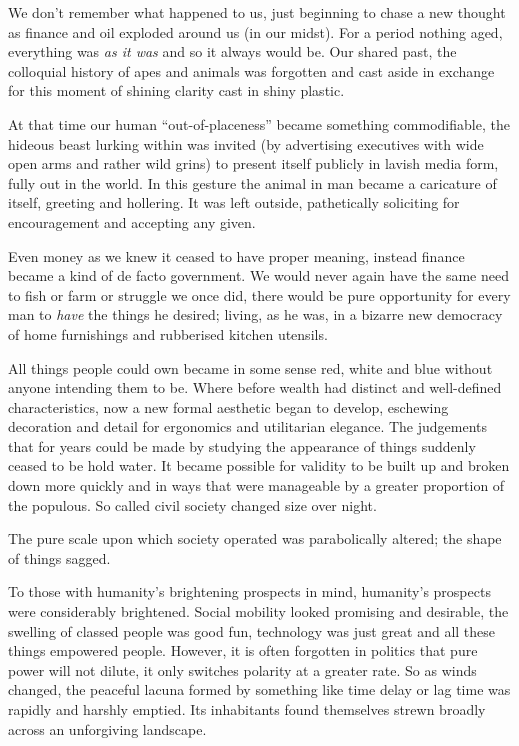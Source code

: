 \documentclass{book}
\begin{document}
We don't remember what happened to us, just beginning to chase a new thought as
finance and oil exploded around us (in our midst). For a period nothing aged,
everything was \emph{as it was} and so it always would be. Our shared past, the
colloquial history of apes and animals was forgotten and cast aside in exchange
for this moment of shining clarity cast in shiny plastic.

At that time our human ``out-of-placeness'' became something commodifiable, the
hideous beast lurking within was invited (by advertising executives with wide
open arms and rather wild grins) to present itself publicly in lavish media
form, fully out in the world. In this gesture the animal in man became a
caricature of itself, greeting and hollering. It was left outside, pathetically
soliciting for encouragement and accepting any given.

Even money as we knew it ceased to have proper meaning, instead finance became
a kind of de facto government. We would never again have the same need to fish
or farm or struggle we once did, there would be pure opportunity for every man
to \emph{have} the things he desired; living, as he was, in a bizarre new
democracy of home furnishings and rubberised kitchen utensils.

All things people could own became in some sense red, white and blue without
anyone intending them to be. Where before wealth had distinct and well-defined
characteristics, now a new formal aesthetic began to develop, eschewing
decoration and detail for ergonomics and utilitarian elegance. The judgements
that for years could be made by studying the appearance of things suddenly
ceased to be hold water.  It became possible for validity to be built up and
broken down more quickly and in ways that were manageable by a greater
proportion of the populous. So called civil society changed size over night.

The pure scale upon which society operated was parabolically altered; the shape
of things sagged.

To those with humanity's brightening prospects in mind, humanity's prospects
were considerably brightened. Social mobility looked promising and desirable,
the swelling of classed people was good fun, technology was just great and all
these things empowered people. However, it is often forgotten in politics that
pure power will not dilute, it only switches polarity at a greater rate. So as
winds changed, the peaceful lacuna formed by something like time delay or lag
time was rapidly and harshly emptied. Its inhabitants found themselves strewn
broadly across an unforgiving landscape.
\end{document}
